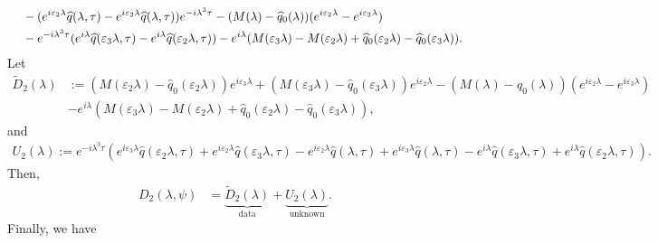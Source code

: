 \begin{align*}
    &\hspace{1pc}-(e^{i\varepsilon_2\lambda}\widehat{q}(\lambda,\tau) - e^{i\varepsilon_3\lambda}\widehat{q}(\lambda,\tau)) e^{-i \lambda^3 \tau}-( M(\lambda) - \widehat{q}_0(\lambda))(e^{i\varepsilon_2\lambda} - e^{i\varepsilon_3\lambda}) \\
    &\hspace{1pc}- e^{-i \lambda^3 \tau}(e^{i\lambda}\widehat{q}(\varepsilon_3\lambda,\tau) - e^{i\lambda}\widehat{q}(\varepsilon_2\lambda,\tau))  - e^{i\lambda} (M(\varepsilon_3\lambda) - M(\varepsilon_2\lambda)+ \widehat{q}_0(\varepsilon_2\lambda) - \widehat{q}_0(\varepsilon_3\lambda)).
\end{align*}
Let 
\begin{align*}
    \widetilde{D}_2(\lambda) &:= (M(\varepsilon_2\lambda) - \widehat{q}_0(\varepsilon_2\lambda))e^{i \varepsilon_3\lambda} +(M(\varepsilon_3\lambda) - \widehat{q}_0(\varepsilon_3\lambda))e^{i \varepsilon_2\lambda} -( M(\lambda) - \widehat{q}_0(\lambda))(e^{i\varepsilon_2\lambda} - e^{i\varepsilon_3\lambda})\\
    &- e^{i\lambda} (M(\varepsilon_3\lambda) - M(\varepsilon_2\lambda)+ \widehat{q}_0(\varepsilon_2\lambda) - \widehat{q}_0(\varepsilon_3\lambda)),
\end{align*}
and 
\begin{align*}
    U_2(\lambda) := e^{-i \lambda^3 \tau} (e^{i \varepsilon_3\lambda} \widehat{q}(\varepsilon_2\lambda,\tau) + e^{i \varepsilon_2\lambda}\widehat{q}(\varepsilon_3\lambda,\tau)- e^{i\varepsilon_2\lambda}\widehat{q}(\lambda,\tau) + e^{i\varepsilon_3\lambda}\widehat{q}(\lambda,\tau) - e^{i\lambda}\widehat{q}(\varepsilon_3\lambda,\tau) + e^{i\lambda}\widehat{q}(\varepsilon_2\lambda,\tau)).
\end{align*}
Then,
\begin{align*}
    D_2(\lambda,\psi) &= \underbrace{\widetilde{D}_2(\lambda)}_\text{data} + \underbrace{U_2(\lambda)}_\text{unknown}.
\end{align*}
Finally, we have 
